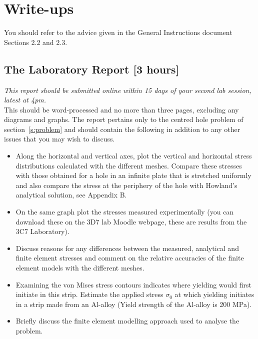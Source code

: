 \documentclass[11pt,a4paper]{article}
\begin{document}
%
\section{Write-ups}
%
You should refer to the advice given in the General Instructions document Sections 2.2
and 2.3.
%
\subsection{The Laboratory Report [3 hours]}
%
\textit{This report should be submitted online within 15 days of your second lab session, latest at 4pm.}  \\


This should be word-processed and no more than three pages, excluding any diagrams
and graphs. The report pertains only to the centred hole problem of section~\ref{s:problem} and should
contain the following in addition to any other issues that you may wish to discuss.
%
\begin{itemize}
\item Along the horizontal and vertical axes, plot the vertical and horizontal stress distributions calculated with the different meshes. Compare these stresses with those obtained for a hole in an infinite
plate that is stretched uniformly and also compare the stress at the periphery of
the hole with Howland's analytical solution, see Appendix B.
\item On the same graph plot the stresses measured experimentally (you can download these on the 3D7 lab Moodle webpage, these are results from
the 3C7 Laboratory).
\item Discuss reasons for any differences between the measured, analytical and finite element stresses and comment on the relative accuracies of the finite element models
with the different meshes.
\item Examining the von Mises stress contours indicates where yielding would first initiate in this strip. Estimate the applied stress $\sigma_0$ at which yielding initiates in a
strip made from an Al-alloy (Yield strength of the Al-alloy is 200 MPa).
\item Briefly discuss the finite element modelling approach used to analyse the problem.
\end{itemize}
%
\end{document}
